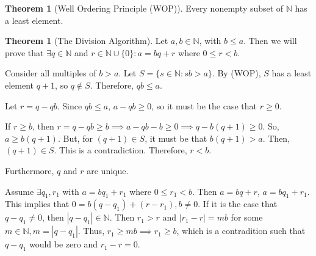 \documentclass[10pt]{article}
\theoremstyle{definition}
\newtheorem{theorem}[equation]{Theorem}
\newcommand{\N}{\mathbb{N}}
\begin{document}
\begin{theorem}[Well Ordering Principle (WOP)]
  Every nonempty subset of $\N$ has a least element.
\end{theorem}

\begin{theorem}[The Division Algorithm]
  Let $a,b\in\N$, with $b\leq a$. Then we will prove that $\exists q\in \N$ and $r\in\N\cup\{0\}:a=bq+r$ where $0\leq r < b$.

  Consider all multiples of $b>a$. Let $S=\{s\in\N:sb>a\}$. By (WOP), $S$ has a least element $q+1$, so $q\not\in S$. Therefore, $qb\leq a$.

  Let $r=q-qb$. Since $qb\leq a$, $a-qb \geq 0$, so it must be the case that $r\geq 0$.

  If $r\geq b$, then $r=q-qb \geq b \implies a-qb-b \geq 0 \implies q-b(q+1) \geq 0$. So, $a\geq b(q+1)$. But, for $(q+1)\in S$, it must be that $b(q+1) > a$. Then, $(q+1)\in S$. This is a contradiction. Therefore, $r<b$.

  Furthermore, $q$ and $r$ are unique.

  Assume $\exists q_1,r_1$ with $a=bq_1 + r_1$ where $0\leq r_1 < b$. Then $a=bq+r$, $a=bq_1+r_1$. This implies that $0=b(q-q_1) + (r-r_1), b\neq 0$. If it is the case that $q-q_1\neq 0$, then $|q-q_1|\in\N$. Then $r_1 > r$ and $|r_1-r|=mb$ for some $m\in\N, m=|q-q_1|$. Thus, $r_1 \geq mb\implies r_1\geq b$, which is a contradition such that $q-q_1$ would be zero and $r_1-r=0$.
\end{theorem}
\end{document}
